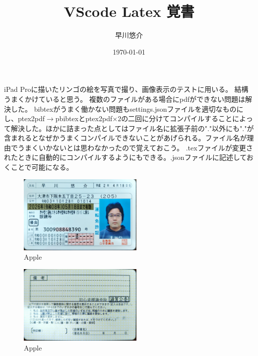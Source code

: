 \documentclass[a4paper,12pt]{jsarticle}
\begin{document}
\title{VScode Latex 覚書}
\author{早川悠介}
\date{\today}
\maketitle
iPad Proに描いたリンゴの絵を写真で撮り、画像表示のテストに用いる。
結構うまくかけていると思う。
複数のファイルがある場合にpdfができない問題は解決した。
bibtexがうまく働かない問題もsettings.jsonファイルを適切なものにし、ptex2pdf$\rightarrow$pbibtexとptex2pdf$\times 2$の二回に分けてコンパイルすることによって解決した。ほかに詰まった点としてはファイル名に拡張子前の"."以外にも"."が含まれるとなぜかうまくコンパイルできないことがあげられる。ファイル名が理由でうまくいかないとは思わなかったので覚えておこう。
.texファイルが変更されたときに自動的にコンパイルするようにもできる。.jsonファイルに記述しておくことで可能になる。

\begin{figure}[htbp]
\begin{center}
\includegraphics[width=60mm,angle=270]{2022_05_27_2.jpg}
\caption{Apple}
\end{center}
\end{figure}

\begin{figure}[htbp]
\begin{center}
\includegraphics[width=60mm,angle=270]{2022_05_27_1.jpg}
\caption{Apple}
\end{center}
\end{figure}
\end{document}
